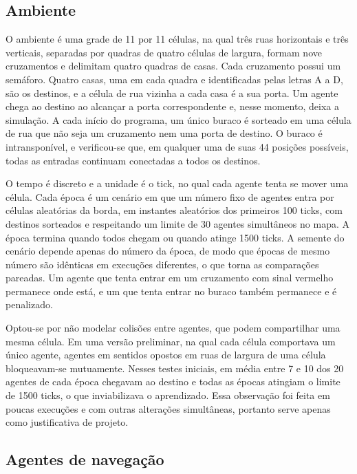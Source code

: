 \documentclass[12pt]{article}
\begin{document}
\subsection{Ambiente}

O ambiente é uma grade de 11 por 11 células, na qual três ruas horizontais e três verticais, separadas por quadras de
quatro células de largura, formam nove cruzamentos e delimitam quatro quadras de casas. Cada cruzamento possui um
semáforo. Quatro casas, uma em cada quadra e identificadas pelas letras A a D, são os destinos, e a célula de rua vizinha a
cada casa é a sua porta. Um agente chega ao destino ao alcançar a porta correspondente e, nesse momento, deixa a
simulação. A cada início do programa, um único buraco é sorteado em uma célula de rua que não seja um cruzamento nem uma
porta de destino. O buraco é intransponível, e verificou-se que, em qualquer uma de suas 44 posições possíveis, todas as
entradas continuam conectadas a todos os destinos.

O tempo é discreto e a unidade é o tick, no qual cada agente tenta se mover uma célula. Cada época é um cenário em que um
número fixo de agentes entra por células aleatórias da borda, em instantes aleatórios dos primeiros 100 ticks, com
destinos sorteados e respeitando um limite de 30 agentes simultâneos no mapa. A época termina quando todos chegam ou
quando atinge 1500 ticks. A semente do cenário depende apenas do número da época, de modo que épocas de mesmo número são
idênticas em execuções diferentes, o que torna as comparações pareadas. Um agente que tenta entrar em um cruzamento com
sinal vermelho permanece onde está, e um que tenta entrar no buraco também permanece e é penalizado.

Optou-se por não modelar colisões entre agentes, que podem compartilhar uma mesma célula. Em uma versão preliminar, na
qual cada célula comportava um único agente, agentes em sentidos opostos em ruas de largura de uma célula bloqueavam-se
mutuamente. Nesses testes iniciais, em média entre 7 e 10 dos 20 agentes de cada época chegavam ao destino e todas as
épocas atingiam o limite de 1500 ticks, o que inviabilizava o aprendizado. Essa observação foi feita em poucas execuções e
com outras alterações simultâneas, portanto serve apenas como justificativa de projeto.

\subsection{Agentes de navegação}
\end{document}

